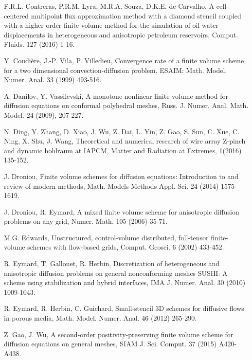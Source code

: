 \documentclass[times,review,preprint,authoryear]{elsarticle}
\begin{document}
\begin{thebibliography}{100}
F.R.L. Contreras, P.R.M. Lyra, M.R.A. Souza, D.K.E. de Carvalho, A cell-centered multipoint flux approximation method with a diamond stencil coupled with a higher order finite volume method for the simulation of oil-water displacements in heterogeneous and anisotropic petroleum
reservoirs, Comput{\color{black}.} Fluids. 127 (2016) 1-16.


Y. Coudi\`{e}re, J.-P. Vila, P. Villedieu, Convergence rate of a finite volume scheme for
a {\color{black} two dimensional convection-diffusion} problem, ESAIM: Math. Model. Numer. Anal. 33
(1999) 493-516.



 {\color{black}
A. Danilov, Y. Vassilevski, A monotone nonlinear finite volume method
for diffusion equations on conformal polyhedral meshes, Russ. J. Numer. Anal. Math. Model. 24 (2009), 207-227.}

N. Ding, Y. Zhang, D. Xiao, J. Wu, Z. Dai, L. Yin, Z. Gao,
S. Sun, C. Xue, C. Ning, X. Shu, J. Wang, Theoretical and numerical research of wire array Z-pinch and dynamic
hohlraum at IAPCM, Matter and Radiation at Extremes, 1(2016) 135-152.

J. Droniou, Finite volume schemes for diffusion equations: Introduction to and review of modern methods,  Math. Models Methods Appl. Sci. 24 (2014) 1575-1619.

J. Droniou, R. Eymard, A mixed finite volume scheme for anisotropic diffusion problems on any grid, Numer. Math. 105 (2006) 35-71.

M.G. Edwards, Unstructured, control-volume distributed, full-tensor finite-volume
schemes with flow-based grids, Comput. Geosci. 6 (2002) 433-452.




R. Eymard, T. Gallouet, R. Herbin, Discretization of heterogeneous and anisotropic diffusion problems on general nonconforming meshes SUSHI: A scheme using stabilization and hybrid interfaces, IMA J. Numer. Anal. 30 (2010) 1009-1043.




R. Eymard, R. Herbin, C. Guichard, Small-stencil 3D schemes for diffusive flows in porous media, Math. Model. Numer. Anal. 46 (2012) 265-290.

Z. Gao, J. Wu, A second-order positivity-preserving finite volume scheme for diffusion equations on general meshes,  SIAM J. Sci. Comput.  37 (2015) {\color{black}A420-A438}.


\end{thebibliography}
\end{document}

